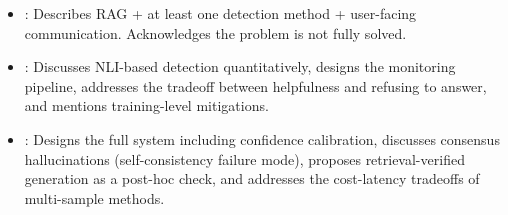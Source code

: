\begin{interviewq}

\goodgreat
\begin{itemize}
    \item {}: Describes RAG + at least one detection method +
    user-facing communication.  Acknowledges the problem is not fully solved.
    \item {}: Discusses NLI-based detection quantitatively, designs
    the monitoring pipeline, addresses the tradeoff between helpfulness and
    refusing to answer, and mentions training-level mitigations.
    \item {}: Designs the full system including confidence
    calibration, discusses consensus hallucinations (self-consistency failure
    mode), proposes retrieval-verified generation as a post-hoc check, and
    addresses the cost-latency tradeoffs of multi-sample methods.
\end{itemize}

\end{interviewq}

\vspace{0.5em}

